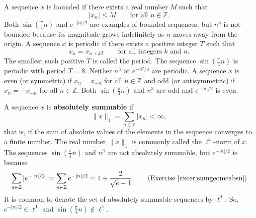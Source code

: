 \documentclass[11pt,a4paper]{book}
\theoremstyle{plain}
\numberwithin{equation}{section}
\newcommand{\reals}{{\mathbb R}}
\newcommand{\ints}{{\mathbb Z}}
\newcommand{\term}{\textbf}
\newcommand{\abs}[1]{\left\vert #1 \right\vert}
\newcommand{\sabs}[1]{\vert #1 \vert}
\begin{document}
A sequence $x$ is bounded if there exists a real number $M$ such that 
\[
\sabs{x_n} \leq M \qquad \text{for all $n \in \ints$}.
\]
Both $\sin( \tfrac{\pi}{4} n)$ and $e^{-\sabs{n}/2}$ are examples of bounded sequences, but $n^3$ is not bounded because its magnitude grows indefinitely as $n$ moves away from the origin.  A sequence $x$ is periodic if there exists a positive integer $T$ such that
\[
x_n = x_{n + kT} \qquad \text{for all integers $k$ and $n$.}
\] 
The smallest such positive $T$ is called the period.  The sequence $\sin( \tfrac{\pi}{4} n )$ is periodic with period $T=8$.  Neither $n^3$ or $e^{-n^2/4}$ are periodic.  
A sequence $x$ is even (or symmetric) if $x_n = x_{-n}$ for all $n \in \ints$ and odd (or antisymmetric) if $x_n = -x_{-n}$ for all $n \in \ints$.  Both $\sin(\frac{\pi}{4} n)$ and $n^3$ are odd and $e^{-\sabs{n}/2}$ is even.  

A sequence $x$ is \term{absolutely summable} if
\[
\|x\|_1 = \sum_{n \in \ints} \sabs{x_n} < \infty,
\]
that is, if the sum of absolute values of the elements in the sequence converges to a finite number.  The real number $\|x\|_1$ is commonly called the $\ell^1$-norm of $x$.  The sequences $\sin(\tfrac{\pi}{4} n)$ and $n^3$ are not absolutely summable, but $e^{-\abs{n}/2}$ is because
\[
\sum_{n \in \ints} \sabs{e^{-\sabs{n}/2}} = \sum_{n \in \ints} e^{-\sabs{n}/2} = 1 + \frac{2}{\sqrt{e} - 1}. \qquad \text{(Exercise~\ref{excer:sumgeomeabsn})}
\]
It is common to denote the set of absolutely summable sequences by $\ell^1$.  So, $e^{-\sabs{n}/2} \in \ell^1$ and $\sin(\tfrac{\pi}{4} n) \notin \ell^1$.
\end{document}

